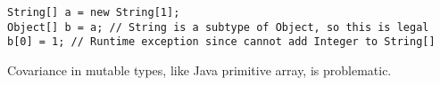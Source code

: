 \begin{algorithm}

\begin{verbatim}
String[] a = new String[1];	
Object[] b = a; // String is a subtype of Object, so this is legal
b[0] = 1; // Runtime exception since cannot add Integer to String[]
\end{verbatim}

\caption{Covariance in mutable types, like Java primitive array, is problematic. \label{mutable-covariance}}
\end{algorithm}